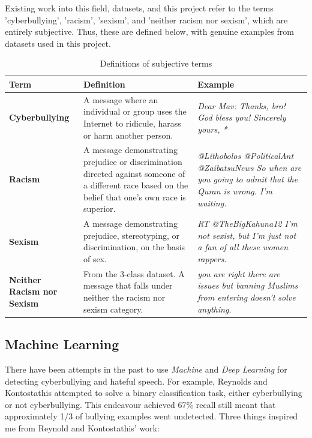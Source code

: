 \documentclass[12pt,a4paper]{article}
\begin{document}
Existing work into this field, datasets, and this project refer to the terms 'cyberbullying', 'racism', 'sexism', and 'neither racism nor sexism', which are entirely subjective. Thus, these are defined below, with genuine examples from datasets used in this project.

\begin{table}[htb]
	\centering
	\caption{Definitions of subjective terms}
	\label{terms}
	\hspace*{-1.5cm}
	\begin{tabular}{p{2.8cm} p{8.0cm} p{7cm}} \hline\hline
		\textbf{Term} & \textbf{Definition} & \textbf{Example}  \\ \hline
		\textbf{Cyberbullying} & A message where an individual or group uses the Internet to ridicule, harass or harm another person. &  \textit{Dear Mav: Thanks, bro! God bless you!  Sincerely yours, *} \\ \hline
		\textbf{Racism} & A message demonstrating prejudice or discrimination directed against someone of a different race based on the belief that one's own race is superior. & \textit{@Lithobolos @PoliticalAnt @ZaibatsuNews So when are you going to admit that the Quran is wrong.  I'm waiting.} \\ \hline
		\textbf{Sexism} & A message demonstrating prejudice, stereotyping, or discrimination, on the basis of sex. & \textit{RT @TheBigKahuna12 I'm not sexist, but I'm just not a fan of all these women rappers.} \\ \hline
		\textbf{Neither Racism nor Sexism} & From the 3-class dataset. A message that falls under neither the racism nor sexism category. & \textit{you are right there are issues but banning Muslims from entering doesn’t solve anything.}\\ \hline
		
	\end{tabular}
\end{table}

\subsection{Machine Learning}
There have been attempts in the past to use \textit{Machine} and \textit{Deep Learning} for detecting cyberbullying and hateful speech. For example, Reynolds and Kontostathis \citeyear[p.4]{Reynolds} attempted to solve a binary classification task, either cyberbullying or not cyberbullying. This endeavour achieved 67\% recall still meant that approximately 1/3 of bullying examples went undetected. Three things inspired me from Reynold and Kontostathis' \citeyear{Reynolds} work:
\end{document}
